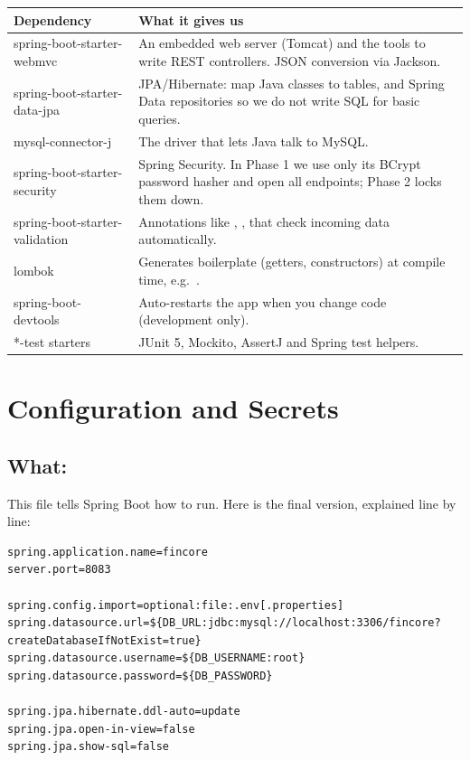 \documentclass[11pt,a4paper]{article}
\newcommand{\code}[1]{\texttt{\detokenize{#1}}}
\begin{document}
\begin{center}
\begin{tabularx}{\textwidth}{>{\ttfamily}l X}
\toprule
\normalfont\bfseries Dependency & \bfseries What it gives us \\
\midrule
spring-boot-starter-webmvc & An embedded web server (Tomcat) and the tools to write REST controllers. JSON conversion via Jackson. \\
spring-boot-starter-data-jpa & JPA/Hibernate: map Java classes to tables, and Spring Data repositories so we do not write SQL for basic queries. \\
mysql-connector-j & The driver that lets Java talk to MySQL. \\
spring-boot-starter-security & Spring Security. In Phase 1 we use only its BCrypt password hasher and open all endpoints; Phase 2 locks them down. \\
spring-boot-starter-validation & Annotations like \code{@NotNull}, \code{@Positive}, \code{@Email} that check incoming data automatically. \\
lombok & Generates boilerplate (getters, constructors) at compile time, e.g.\ \code{@Getter}. \\
spring-boot-devtools & Auto-restarts the app when you change code (development only). \\
\textrm{*-test starters} & JUnit 5, Mockito, AssertJ and Spring test helpers. \\
\bottomrule
\end{tabularx}
\end{center}

\section{Configuration and Secrets}

\subsection{What: \code{application.properties}}
This file tells Spring Boot how to run. Here is the final version, explained line by line:

\begin{lstlisting}[style=plain]
spring.application.name=fincore
server.port=8083

spring.config.import=optional:file:.env[.properties]
spring.datasource.url=${DB_URL:jdbc:mysql://localhost:3306/fincore?createDatabaseIfNotExist=true}
spring.datasource.username=${DB_USERNAME:root}
spring.datasource.password=${DB_PASSWORD}

spring.jpa.hibernate.ddl-auto=update
spring.jpa.open-in-view=false
spring.jpa.show-sql=false
\end{lstlisting}
\end{document}
